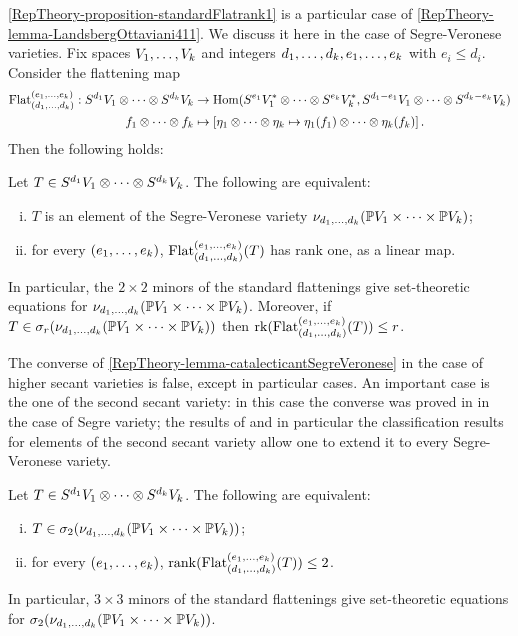 \ref{RepTheory-proposition-standardFlatrank1} is a particular case of \ref{RepTheory-lemma-LandsbergOttaviani411}. We discuss it here in the case of Segre-Veronese varieties. Fix spaces $V_1 , \ldots , V_k$ and integers $d_1 , \ldots , d_k, e_1 , \ldots , e_k$ with $e_i \leq d_i$. Consider the flattening map 
\[
\begin{aligned}
\mathrm{Flat}_{(d_1 , \ldots , d_k)}^{(e_1 , \ldots , e_k)} : S^{d_1} V_1 \otimes \cdots \otimes S^{d_k}V_k &\to \operatorname{Hom} ( S^{e_1} V_1^* \otimes \cdots \otimes S^{e_k}V_k^* , S^{d_1 - e_1} V_1 \otimes \cdots \otimes S^{d_k- e_k}V_k ) \\ 
f_1 \otimes \cdots \otimes f_k &\mapsto \left[ \eta_1 \otimes \cdots \otimes \eta_k \mapsto  \eta_1(f_1) \otimes \cdots \otimes \eta_k(f_k) \right] .
\end{aligned}
\]
Then the following holds:
\begin{lemma}
\label{RepTheory-lemma-catalecticantSegreVeronese}
 Let $T \in  S^{d_1} V_1 \otimes \cdots \otimes S^{d_k}V_k$. The following are equivalent:
 \begin{enumerate}[(i)]
  \item $T$ is an element of the Segre-Veronese variety $\nu_{d_1 , \ldots , d_k} ( \mathbb{P} V_1 \times \cdots \times \mathbb{P} V_k)$;
  \item for every $(e_1 , \ldots , e_k)$, $\mathrm{Flat}_{(d_1 , \ldots , d_k)}^{(e_1 , \ldots , e_k)}(T)$ has rank one, as a linear map. 
 \end{enumerate}
In particular, the $2 \times 2$ minors of the standard flattenings give set-theoretic equations for $\nu_{d_1 , \ldots , d_k} ( \mathbb{P} V_1 \times \cdots \times \mathbb{P} V_k)$. Moreover, if $T \in \sigma_r(\nu_{d_1 , \ldots , d_k} ( \mathbb{P} V_1 \times \cdots \times \mathbb{P} V_k))$ then $\operatorname{rk}(\mathrm{Flat}_{(d_1 , \ldots , d_k)}^{(e_1 , \ldots , e_k)}(T)) \leq r$.
\end{lemma}
The converse of \ref{RepTheory-lemma-catalecticantSegreVeronese} in the case of higher secant varieties is false, except in particular cases. An important case is the one of the second secant variety: in this case the converse was proved in \cite[Theorem 5.1]{LM04} in the case of Segre variety; the results of \cite{BL14} and in particular the classification results for elements of the second secant variety allow one to extend it to every Segre-Veronese variety.
\begin{theorem}
 \label{RepTheory-theorem-LandsbergManivelSigma2}
 Let $T \in  S^{d_1} V_1 \otimes \cdots \otimes S^{d_k}V_k$. The following are equivalent:
 \begin{enumerate}[(i)]
  \item $T \in \sigma_2(\nu_{d_1 , \ldots , d_k} ( \mathbb{P} V_1 \times \cdots \times \mathbb{P} V_k))$;
  \item for every $(e_1 , \ldots , e_k)$, $\mathrm{rank}( \mathrm{Flat}_{(d_1 , \ldots , d_k)}^{(e_1 , \ldots , e_k)}(T) ) \leq 2$. 
 \end{enumerate} 
 In particular, $3 \times 3$ minors of the standard flattenings give set-theoretic equations for $ \sigma_2(\nu_{d_1 , \ldots , d_k} ( \mathbb{P} V_1 \times \cdots \times \mathbb{P} V_k))$.
\end{theorem}
